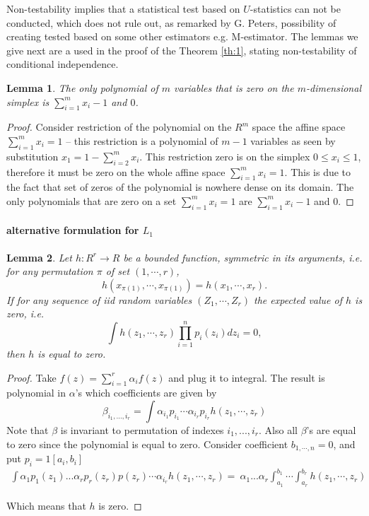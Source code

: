 \documentclass{article}
\newtheorem{lemma}{Lemma}
\begin{document}
Non-testability implies that a statistical test based on $U$-statistics can not be conducted, which does not rule out, as remarked by G. Peters, possibility of creating tested based on some other estimators e.g. M-estimator. The lemmas we give next are a used in the proof of the Theorem  \ref{th:1}, stating non-testability of conditional independence. 

\begin{lemma}
\label{lem:aha}
 The only polynomial of $m$ variables that is zero on the $m$-dimensional simplex is $\sum_{i=1}^m x_i-1$ and $0$.  
\end{lemma}
\begin{proof}
Consider restriction of the polynomial on the $R^m$ space  the affine space $\sum_{i=1}^m x_i=1$  -- this restriction is a polynomial of $m-1$ variables as seen by substitution $x_1 = 1 -\sum_{i=2}^m x_i$. This restriction zero is on the simplex $0 \leq x_i \leq 1$, therefore it must be zero on the whole affine space  $\sum_{i=1}^m x_i=1$. This is due to the fact that set of zeros of the polynomial is nowhere dense on its domain. The only polynomials that are zero on a set $\sum_{i=1}^m x_i=1$ are $\sum_{i=1}^m x_i-1$ and $0$.   
\end{proof}



\paragraph{alternative formulation for $L_1$}


\begin{lemma}
\label{the:Lemma}
Let $h: R^r \to R$ be a bounded function, symmetric in its arguments, i.e. for any permutation $\pi$ of set $(1,\cdots,r)$,
$$
h(x_{\pi(1)},\cdots,x_{\pi(1)}) = h(x_1,\cdots,x_r).   
$$
If for any sequence of iid random variables $(Z_1,\cdots,Z_r)$ the expected value of $h$ is zero, i.e.
$$
\int h(z_1,\cdots,z_r) \prod_{i=1}^n p_i(z_i) d z_i = 0,
$$
then $h$ is equal to zero.
\end{lemma}

\begin{proof}
 Take $f(z) = \sum_{i=1}^{r} \alpha_{i} f(z)$ and plug it to integral. The result is polynomial in $\alpha$'s which coefficients are given by
 \[
  \beta_{i_1,...,i_r} = \int \alpha_{i_1} p_{i_1} \cdots \alpha_{i_r} p_{i_r} h(z_1,\cdots,z_r)
 \]
Note that $\beta$ is invariant to permutation of indexes $i_1,...,i_r$. Also all $\beta$'s are equal to zero since the polynomial is equal to zero. 
Consider coefficient $b_{1,\cdots, n} = 0$, and put $p_i = 1{[a_i,b_i]} $
\begin{align}
 \int \alpha_{1} p_{1}(z_1) ...\alpha_{r} p_{r}(z_r) p(z_r)\cdots \alpha_{i_r} h(z_1,\cdots,z_r) =\
 \alpha_{1}  ...\alpha_{r}  \int_{a_1}^{b_1} \cdots  \int_{a_r}^{b_r}  h(z_1,\cdots,z_r) 
\end{align}

Which means that $h$ is zero.
 
\end{proof}
\end{document}
